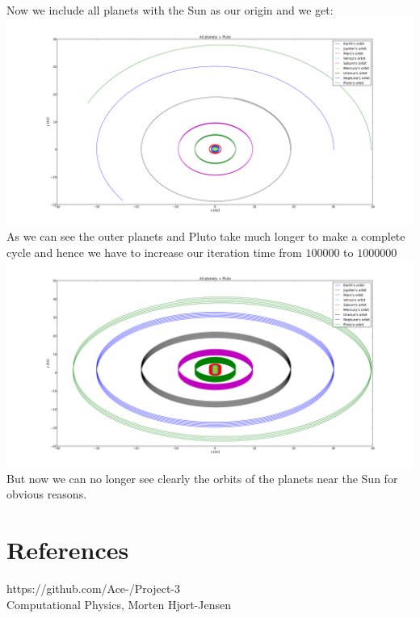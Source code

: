 \documentclass{article}
\begin{document}
Now we include all planets with the Sun as our origin and we get:\\
\includegraphics[scale=0.3]{figure_7.png}\\
As we can see the outer planets and Pluto take much longer to make a complete cycle and hence we have to increase our iteration time from $100000$ to $1000000$\\
\includegraphics[scale=0.3]{figure_8.png}\\
But now we can no longer see clearly the orbits of the planets near the Sun for obvious reasons. 

\section{References}
https://github.com/Ace-/Project-3\\
Computational Physics, Morten Hjort-Jensen
\end{document}
